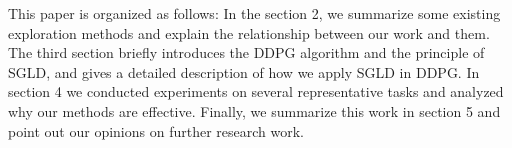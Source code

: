 This paper is organized as follows: In the section 2, we summarize some existing exploration methods and explain the relationship between our work and them. The third section briefly introduces the DDPG algorithm and the principle of SGLD, and gives a detailed description of how we apply SGLD in DDPG. In section 4 we conducted experiments on several representative tasks and analyzed why our methods are effective. Finally, we summarize this work in section 5 and point out our opinions on further research work.
